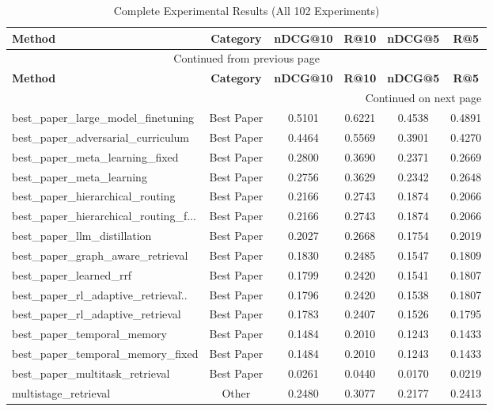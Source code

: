 \begin{longtable}{lccccc}
\caption{Complete Experimental Results (All 102 Experiments)}
\label{tab:all_experiments} \\
\toprule
\textbf{Method} & \textbf{Category} & \textbf{nDCG@10} & \textbf{R@10} & \textbf{nDCG@5} & \textbf{R@5} \\
\midrule
\endfirsthead
\multicolumn{6}{c}{{Continued from previous page}} \\
\toprule
\textbf{Method} & \textbf{Category} & \textbf{nDCG@10} & \textbf{R@10} & \textbf{nDCG@5} & \textbf{R@5} \\
\midrule
\endhead
\bottomrule
\multicolumn{6}{r}{{Continued on next page}} \\
\endfoot
\bottomrule
\endlastfoot
best\_paper\_large\_model\_finetuning & Best Paper & 0.5101 & 0.6221 & 0.4538 & 0.4891 \\
best\_paper\_adversarial\_curriculum & Best Paper & 0.4464 & 0.5569 & 0.3901 & 0.4270 \\
best\_paper\_meta\_learning\_fixed & Best Paper & 0.2800 & 0.3690 & 0.2371 & 0.2669 \\
best\_paper\_meta\_learning & Best Paper & 0.2756 & 0.3629 & 0.2342 & 0.2648 \\
best\_paper\_hierarchical\_routing & Best Paper & 0.2166 & 0.2743 & 0.1874 & 0.2066 \\
best\_paper\_hierarchical\_routing\_f... & Best Paper & 0.2166 & 0.2743 & 0.1874 & 0.2066 \\
best\_paper\_llm\_distillation & Best Paper & 0.2027 & 0.2668 & 0.1754 & 0.2019 \\
best\_paper\_graph\_aware\_retrieval & Best Paper & 0.1830 & 0.2485 & 0.1547 & 0.1809 \\
best\_paper\_learned\_rrf & Best Paper & 0.1799 & 0.2420 & 0.1541 & 0.1807 \\
best\_paper\_rl\_adaptive\_retrieval\... & Best Paper & 0.1796 & 0.2420 & 0.1538 & 0.1807 \\
best\_paper\_rl\_adaptive\_retrieval & Best Paper & 0.1783 & 0.2407 & 0.1526 & 0.1795 \\
best\_paper\_temporal\_memory & Best Paper & 0.1484 & 0.2010 & 0.1243 & 0.1433 \\
best\_paper\_temporal\_memory\_fixed & Best Paper & 0.1484 & 0.2010 & 0.1243 & 0.1433 \\
best\_paper\_multitask\_retrieval & Best Paper & 0.0261 & 0.0440 & 0.0170 & 0.0219 \\
multistage\_retrieval & Other & 0.2480 & 0.3077 & 0.2177 & 0.2413 \\

\end{longtable}
